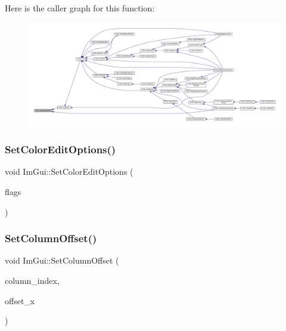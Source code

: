 Here is the caller graph for this function\+:
\nopagebreak
\begin{figure}[H]
\begin{center}
\leavevmode
\includegraphics[width=350pt]{namespace_im_gui_aa4824a1b351c063b4aff9b9f4fb5fd4d_icgraph}
\end{center}
\end{figure}
\mbox{\label{namespace_im_gui_ac768151f2ac6c7d79b31b934cc0e9d05}} 
\subsubsection{\texorpdfstring{Set\+Color\+Edit\+Options()}{SetColorEditOptions()}}
{\footnotesize\ttfamily void Im\+Gui\+::\+Set\+Color\+Edit\+Options (\begin{DoxyParamCaption}\item[{\mbox{\hyperlink{imgui_8h_a6b2d5e95adc38f22c021252189f669c6}{Im\+Gui\+Color\+Edit\+Flags}}}]{flags }\end{DoxyParamCaption})}

\mbox{\label{namespace_im_gui_a8cc207211d6cf3f77b505e24aed4ebcc}} 
\subsubsection{\texorpdfstring{Set\+Column\+Offset()}{SetColumnOffset()}}
{\footnotesize\ttfamily void Im\+Gui\+::\+Set\+Column\+Offset (\begin{DoxyParamCaption}\item[{int}]{column\+\_\+index,  }\item[{float}]{offset\+\_\+x }\end{DoxyParamCaption})}

